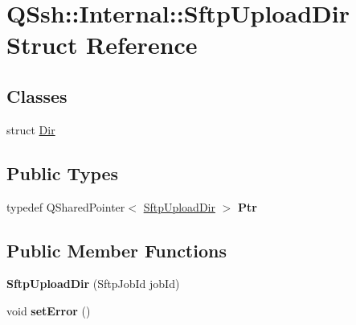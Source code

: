 \hypertarget{struct_q_ssh_1_1_internal_1_1_sftp_upload_dir}{}\section{Q\+Ssh\+:\+:Internal\+:\+:Sftp\+Upload\+Dir Struct Reference}
\label{struct_q_ssh_1_1_internal_1_1_sftp_upload_dir}
\subsection*{Classes}
\begin{DoxyCompactItemize}
\item 
struct \mbox{\hyperlink{struct_q_ssh_1_1_internal_1_1_sftp_upload_dir_1_1_dir}{Dir}}
\end{DoxyCompactItemize}
\subsection*{Public Types}
\begin{DoxyCompactItemize}
\item 
\mbox{\label{struct_q_ssh_1_1_internal_1_1_sftp_upload_dir_ab1c97e4a81e1bde87c15709db70890b8}} 
typedef Q\+Shared\+Pointer$<$ \mbox{\hyperlink{struct_q_ssh_1_1_internal_1_1_sftp_upload_dir}{Sftp\+Upload\+Dir}} $>$ {\bfseries Ptr}
\end{DoxyCompactItemize}
\subsection*{Public Member Functions}
\begin{DoxyCompactItemize}
\item 
\mbox{\label{struct_q_ssh_1_1_internal_1_1_sftp_upload_dir_aea4255fd2760d4f74ec4c95a21e4b903}} 
{\bfseries Sftp\+Upload\+Dir} (Sftp\+Job\+Id job\+Id)
\item 
\mbox{\label{struct_q_ssh_1_1_internal_1_1_sftp_upload_dir_a210389b26a9d20fb53bfb715836f21d9}} 
void {\bfseries set\+Error} ()
\end{DoxyCompactItemize}
